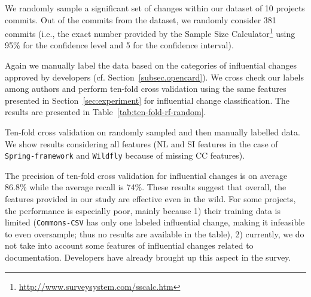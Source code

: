 We randomly sample a significant set of changes within our dataset of 10 projects commits. 
Out of the \numChanges commits from the dataset, we randomly consider 381 commits (i.e., the
exact number provided by the Sample Size
Calculator\footnote{\url{http://www.surveysystem.com/sscalc.htm}} using
95\% for the confidence level and 5 for the confidence interval).

Again we manually label the data based on the categories of influential changes approved by developers (cf. Section~\ref{subsec.opencard}).
We cross check our labels among authors and perform ten-fold cross validation using the same features presented in Section~\ref{sec:experiment} for
influential change classification. The results are presented in Table~\ref{tab:ten-fold-rf-random}.

\begin{table}[h!]
\caption{Ten-fold cross validation on randomly sampled
and then manually labelled data. We show results considering all features (NL
and SI features in the case of {\tt Spring-framework} and {\tt Wildfly}
because of missing CC features).}

\label{tab:ten-fold-rf-random}
    
\end{table}

The precision of ten-fold cross validation for influential changes is on average 86.8\% while the average recall
is 74\%. These results suggest that overall, the features provided in our
study are effective even in the wild. For some projects, the performance is
especially poor, mainly because 1) their training data is limited ({\tt Commons-CSV}
has only one labeled influential change, making it infeasible to even oversample; thus
no results are available in the table), 2) currently, we do not take into account some features
of influential changes related to documentation. Developers have already brought up this aspect in the survey.

